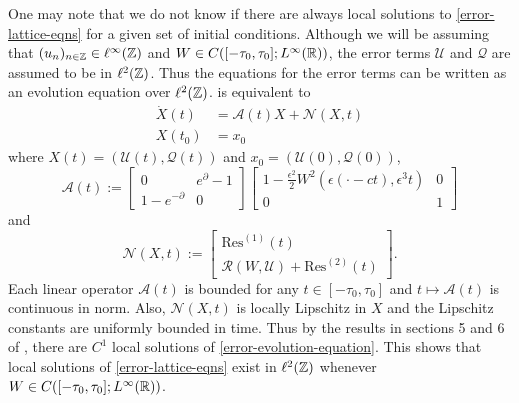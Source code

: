 One may note that we do not know if there are always local solutions to \cref{error-lattice-eqns} for a given set of initial conditions. Although we will be assuming that \((u_n)_{n\in\mathbb{Z}} \in \ell^\infty(\mathbb{Z})\) and \(W \in C([-\tau_0, \tau_0]; L^\infty(\mathbb{R}))\), the error terms \(\mathcal U\) and \(\mathcal Q\) are assumed to be in \(\ell^2(\mathbb{Z})\). Thus the equations for the error terms can be written as an evolution equation over \(\ell^2(\mathbb{Z})\).  is equivalent to 
\begin{equation}\label{error-evolution-equation}
	\begin{aligned}
		\dot X(t) &= \mathcal A (t) X + \mathcal N(X, t) \\
		X(t_0) &= x_0
	\end{aligned}
\end{equation}
where \(X(t) = (\mathcal U(t), \mathcal Q(t))\) and \(x_0 = (\mathcal U(0), \mathcal Q(0))\),
\begin{equation}
	\mathcal A(t) := \begin{bmatrix}
		0 & e^\partial - 1 \\
		1 - e^{-\partial} & 0
	\end{bmatrix} \begin{bmatrix}
		1 - \frac{\epsilon^2} 2 W^2(\epsilon(\cdot - ct), \epsilon^3t) & 0 \\ 
		0  & 1
	\end{bmatrix}
\end{equation}
and 
\begin{equation}
	\mathcal N(X,t) := \begin{bmatrix}
		\mathrm{Res}^{(1)}(t) \\
		\mathcal R(W, \mathcal U) + \mathrm{Res}^{(2)}(t)
	\end{bmatrix}.
\end{equation}
Each linear operator \(\mathcal A(t)\) is bounded for any \(t\in[-\tau_0,\tau_0]\) and \(t\mapsto \mathcal A(t)\) is continuous in norm. Also, \(\mathcal N(X,t)\) is locally Lipschitz in \(X\) and the Lipschitz constants are uniformly bounded in time. Thus by the results in sections 5 and 6 of \cite{pazy2012semigroups}, there are \(C^1\) local solutions of \cref{error-evolution-equation}. This shows that local solutions of \cref{error-lattice-eqns} exist in \(\ell^2(\mathbb{Z})\) whenever \(W\in C([-\tau_0, \tau_0]; L^\infty(\mathbb{R}))\).

